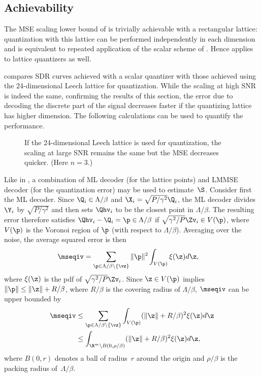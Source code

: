 \subsection{Achievability}

The MSE scaling lower bound of  is trivially achievable
with a rectangular lattice: quantization with this lattice can be performed
independently in each dimension and is equivalent to repeated application of the
scalar scheme of . Hence 
applies to lattice quantizers as well. 

 compares SDR curves achieved with a scalar quantizer
with those achieved using the 24-dimensional Leech lattice for quantization.
While the scaling at high SNR is indeed the same, confirming the results of this
section, the error due to decoding the discrete part of the signal decreases
faster if the quantizing lattice has higher dimension. The following
calculations can be used to quantify the performance.

\begin{figure}
  \begin{center}
    
  \end{center}
  \caption{If the 24-dimensional Leech lattice is used for quantization, the
  scaling at large SNR remains the same but the MSE decreases quicker. (Here $n
  = 3$.)}
  \label{fig:sim_latticeperf}
\end{figure}

Like in , a combination of ML decoder (for the lattice
points) and LMMSE decoder (for the quantization error) may be used to
estimate~$\S$.  Consider first the ML decoder. Since $\Q_i \in \Lambda/\beta$
and $\X_i = \sqrt{P/\gamma^2} \Q_i$, the ML decoder divides $\Y_i$ by
$\sqrt{P/\gamma^2}$ and then sets $\Qhv_i$ to be the closest point in
$\Lambda/\beta$. The resulting error therefore satisfies $\Qhv_i - \Q_i = \p \in
\Lambda/\beta$ if $\sqrt{\gamma^2/P} \Zv_i \in V(\p)$, where $V(\p)$ is the
Voronoi region of $\p$ (with respect to $\Lambda/\beta$). Averaging over the
noise, the average squared error is then
\begin{align*}
  \mseqiv &= \sum_{\p \in \Lambda/\beta \setminus \{\vz\}} \| \p \|^2
  \int_{V(\p)} \xi(\z) d\z,
\end{align*}
where $\xi(\z)$ is the pdf of $\sqrt{\gamma^2/P} \Zv_i$.
Since $\z \in V(\p)$ implies $\|\p\| \le \|\z\| + R/\beta$, where $R/\beta$ is
the covering radius of $\Lambda/\beta$, $\mseqiv$ can be upper bounded by
\begin{align*}
  \mseqiv &\le \sum_{\p \in \Lambda/\beta \setminus \{\vz\}} \int_{V(\p)}
  (\|\z\| + R/\beta)^2 \xi(\z) d\z \\
  &\le \int_{\R^m \setminus B(0,\rho/\beta)} (\|\z\| + R/\beta)^2 \xi(\z) d\z,
\end{align*}
where $B(0,r)$ denotes a ball of radius~$r$ around the origin and $\rho/\beta$
is the packing radius of~$\Lambda/\beta$. 


